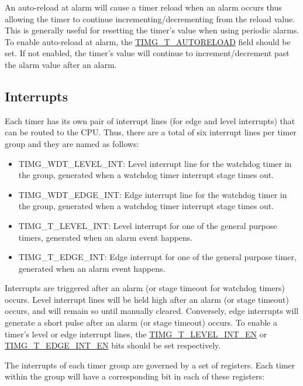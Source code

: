 \documentclass[main\_\_EN.tex]{subfiles}
\begin{document}
An auto-reload at alarm will cause a timer reload when an alarm occurs thus allowing the timer to continue incrementing/decrementing from the reload value. This is generally useful for resetting the timer's value when using periodic alarms. To enable auto-reload at alarm, the \hyperref[fielddesc:TIMGTXAUTORELOAD]{TIMG\_T\_AUTORELOAD} field should be set. If not enabled, the timer's value will continue to increment/decrement past the alarm value after an alarm.
\subsection{Interrupts}
Each timer has its own pair of interrupt lines (for edge and level interrupts) that can be routed to the CPU. Thus, there are a total of six interrupt lines per timer group and they are named as follows:
\begin{itemize}
\item \label{int:TIMERSWDTLEVELINT}TIMG\_WDT\_LEVEL\_INT:
Level interrupt line for the watchdog timer in the group, generated when a watchdog timer interrupt stage times out.
\item \label{int:TIMERSWDTEDGEINT}TIMG\_WDT\_EDGE\_INT: Edge interrupt line for the watchdog timer in the group, generated when a watchdog timer interrupt stage times out.
\item \label{int:TIMERSTXLEVELINT}TIMG\_T\_LEVEL\_INT: Level interrupt for one of the general purpose timers, generated when an alarm event happens.
\item \label{int:TIMERSTXEDGEINT}TIMG\_T\_EDGE\_INT: Edge interrupt for one of the general purpose timer, generated when an alarm event happens.
\end{itemize}

Interrupts are triggered after an alarm (or stage timeout for watchdog timers) occurs. Level interrupt lines will be held high after an alarm (or stage timeout) occurs, and will remain so until manually cleared. Conversely, edge interrupts will generate a short pulse after an alarm (or stage timeout) occurs. To enable a timer's level or edge interrupt lines, the \hyperref[fielddesc:TIMGTXLEVELINTEN]{TIMG\_T\_LEVEL\_INT\_EN} or \hyperref[fielddesc:TIMGTXEDGEINTEN]{TIMG\_T\_EDGE\_INT\_EN} bits should be set respectively.

The interrupts of each timer group are governed by a set of registers. Each timer within the group will have a corresponding bit in each of these registers:
\end{document}
